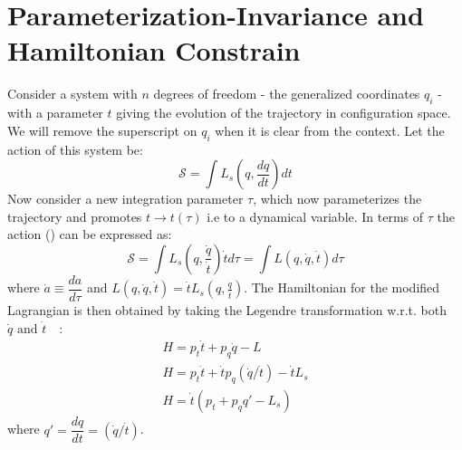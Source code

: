 \section{Parameterization-Invariance and Hamiltonian Constrain}
Consider a system with $n$ degrees of freedom - the generalized coordinates $q_i$ - with a parameter $t$ giving the evolution of the trajectory in configuration space. We will remove the superscript
on $q_i$ when it is clear from the context. Let the action of this system be:
\begin{equation}
	\label{eq:action_t}
	\mathcal{S} = \int L_s\left(q, \frac{dq}{dt}\right)  dt
\end{equation}
Now consider a new integration parameter \(\tau\), which now parameterizes the trajectory and promotes \(t \to t(\tau)\) 
i.e to a dynamical variable.
In terms of \(\tau\) the action () can be expressed as:
\begin{equation}
	\mathcal{S} = \int L_s\left(q, \frac{\Dot{q}}{\Dot{t}}\right)  \Dot{t} d\tau =  \int L\left(q, \Dot{q}, \Dot{t}\right)   d\tau
\end{equation}
where \(\dot{a} \equiv \dfrac{d a}{d \tau}\) and 
\(L\left(q, \Dot{q}, \Dot{t}\right) = \Dot{t}L_s\left(q, \frac{\Dot{q}}{\Dot{t}}\right)  \).
The Hamiltonian for the modified Lagrangian is then obtained by taking the Legendre
transformation w.r.t. both \(\dot{q} \text{ and } \dot{t}\)\ ~\cite{deriglazov2011reparametrization}:
\begin{equation}
	\label{eq:hamlt_L}
	\begin{gathered}
		H =  p_t \dot{t} + p_q \dot{q} - L\\
		H =  p_t \dot{t} + \dot{t} p_q (\dot{q}/\dot{t}) - \dot{t}L_s\\
		H  = \dot{t} \left(p_t + p_q q'- L_s\right)
	\end{gathered}
\end{equation}
where \(q'=\dfrac{dq}{dt}=(\dot{q}/\dot{t})\).

